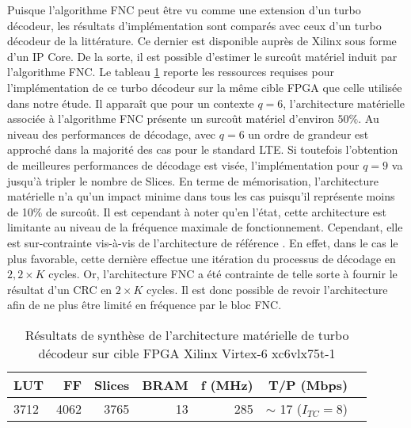 Puisque l'algorithme FNC peut être vu comme une extension d'un turbo décodeur, les résultats d'implémentation sont 
comparés avec ceux d'un turbo décodeur de la littérature. Ce dernier est disponible auprès de Xilinx sous forme d'un IP Core. 
De la sorte, il est possible d'estimer
le surcoût matériel induit par l'algorithme FNC. Le tableau \ref{tab:fnc_ip_xilinx} reporte les ressources requises
pour l'implémentation de ce turbo décodeur \cite{xilinxUMTS} sur la même cible FPGA que celle utilisée dans notre étude. 
Il apparaît que pour un contexte $q=6$, l'architecture matérielle associée à l'algorithme FNC présente un surcoût 
matériel d'environ $50\%$. Au niveau des performances de décodage, avec $q=6$ un ordre de grandeur est approché dans la 
majorité des cas pour le standard LTE. Si toutefois l'obtention de meilleures performances de décodage est visée,
l'implémentation pour $q=9$ va jusqu'à tripler le nombre de Slices. En terme de mémorisation, l'architecture matérielle 
n'a qu'un impact minime dans tous les cas puisqu'il représente moins de 10\% de surcoût. Il est 
cependant à noter qu'en l'état, cette architecture est limitante au niveau de la fréquence maximale de fonctionnement. 
Cependant, elle est sur-contrainte vis-à-vis de l'architecture de référence \cite{xilinxUMTS}. En effet, dans le cas le plus 
favorable, cette dernière effectue une itération du processus de décodage en $2,2\times K$ cycles. Or, l'architecture FNC
a été contrainte de telle sorte à fournir le résultat d'un CRC en $2\times K$ cycles. Il est donc possible de revoir l'architecture 
afin de ne plus être limité en fréquence par le bloc FNC.

\begin{table}[!ht]
	\centering
	\caption{Résultats de synthèse de l'architecture matérielle de turbo décodeur %
	sur cible FPGA 
	Xilinx Virtex-6 xc6vlx75t-1}
	\label{tab:fnc_ip_xilinx}
	\begin{tabular}{lrrrrrr} 
		\toprule
		LUT & FF & Slices & BRAM & f (MHz)& T/P (Mbps) \\ 
		\midrule
		3712 & 4062 & 3765 & 13 & 285 & $\sim$ 17 ($I_{TC} = 8$)\\ 
		\bottomrule 
	\end{tabular}
\end{table}

